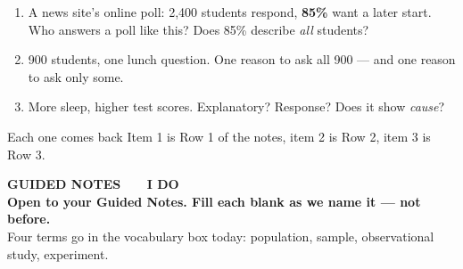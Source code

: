 \documentclass[aspectratio=169, 11pt]{beamer}
\begin{document}
\begin{frame}[t, plain]
  \begin{enumerate}\setlength{\itemsep}{8pt}
    \item A news site's online poll: 2{,}400 students respond, \textbf{85\%} want a later start.
          Who answers a poll like this? Does 85\% describe \emph{all} students?
    \item 900 students, one lunch question. One reason to ask all 900 --- and one reason to ask
          only some.
    \item More sleep, higher test scores. Explanatory? Response? Does it show \emph{cause}?
  \end{enumerate}
  \vspace{6pt}
  \begin{block}{Each one comes back}
    Item 1 is Row 1 of the notes, item 2 is Row 2, item 3 is Row 3.
  \end{block}
\end{frame}

{
\begin{frame}[plain]
  \vspace{1.8cm}\hspace{0.8cm}%
  \begin{minipage}{0.86\textwidth}
    {\color{goldacc}\bfseries\small GUIDED NOTES \ \textbullet\ \ I DO}\\[0.7cm]
    {\color{white}\bfseries\Large Open to your Guided Notes. Fill each blank as we name it
    --- not before.}\\[0.9cm]
    {\color{skymid}\small Four terms go in the vocabulary box today: population, sample,
    observational study, experiment.}
  \end{minipage}
\end{frame}
}
\end{document}
